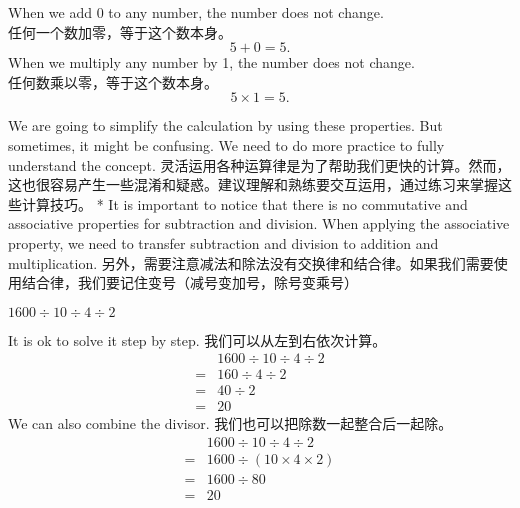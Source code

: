 \begin{newprop}
When we add 0 to any number, the number does not change.\\
任何一个数加零，等于这个数本身。
$$
5+0 = 5.
$$
When we multiply any number by 1, the number does not change.\\
任何数乘以零，等于这个数本身。
$$
5\times 1 = 5.
$$
\end{newprop}

\begin{paracol}{2}
We are going to simplify the calculation by using these properties. But sometimes, it might be confusing. We need to do more practice to fully understand the concept. 
\switchcolumn[1]
灵活运用各种运算律是为了帮助我们更快的计算。然而，这也很容易产生一些混淆和疑惑。建议理解和熟练要交互运用，通过练习来掌握这些计算技巧。
\switchcolumn[0]*
It is important to notice that there is no commutative and associative properties for subtraction and division. When applying the associative property, we need to transfer subtraction and division to addition and multiplication.
\switchcolumn[1]
另外，需要注意减法和除法没有交换律和结合律。如果我们需要使用结合律，我们要记住变号（减号变加号，除号变乘号）
\end{paracol}

\begin{example}
$1600\div 10\div 4\div 2$
\end{example}
\begin{solution}
It is ok to solve it step by step. 我们可以从左到右依次计算。
\begin{align*}
&1600\div 10\div 4\div 2\\
=&160\div 4\div 2\\
=&40\div 2\\
=& 20
\end{align*}
We can also combine the divisor. 我们也可以把除数一起整合后一起除。
\begin{align*}
&1600\div 10\div 4\div 2\\
=&1600\div (10\times 4\times 2)\\
=&1600\div 80\\
=& 20
\end{align*}
\end{solution}
   \newpage
